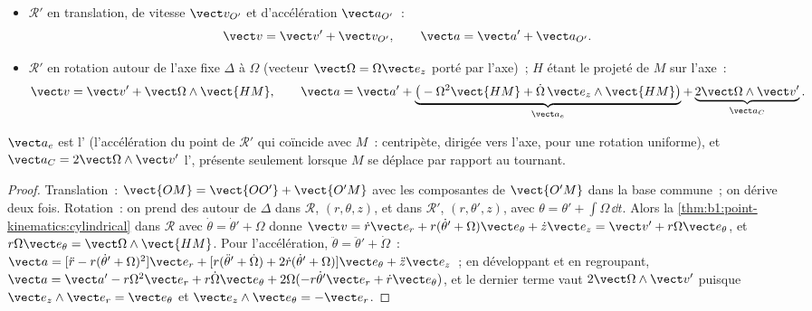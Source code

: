 \begin{theorem}\label{thm:b1:non-inertial-frames:composition}
\begin{itemize}
  \item $\mathcal R'$ en translation, de vitesse $\vect v_{O'}$ et
        d'accélération $\vect a_{O'}$~:
        \[
        \vect v = \vect v' + \vect v_{O'}, \qquad \vect a = \vect a' + \vect a_{O'} .
        \]
  \item $\mathcal R'$ en rotation autour de l'axe fixe $\Delta$ à
        $\Omega$ (vecteur $\vect\Omega = \Omega\vect e_z$ porté par
        l'axe)~; $H$ étant le projeté de $M$ sur l'axe~:
        \[
        \vect v = \vect v' + \vect\Omega\wedge\vect{HM}, \qquad
        \vect a = \vect a' + \underbrace{\big(-\Omega^2\vect{HM} + \dot\Omega\,\vect e_z\wedge\vect{HM}\big)}_{\vect a_e}
        + \underbrace{2\vect\Omega\wedge\vect v'}_{\vect a_C} .
        \]
\end{itemize}
$\vect a_e$ est l'\emph{} (l'accélération du
point de $\mathcal R'$ qui coïncide avec $M$~: centripète, dirigée vers
l'axe, pour une rotation uniforme), et $\vect a_C = 2\vect\Omega\wedge\vect v'$
l'\emph{}, présente seulement lorsque $M$ se
déplace par rapport au  tournant.
\end{theorem}

\begin{proof}
Translation~: $\vect{OM} = \vect{OO'} + \vect{O'M}$ avec les composantes
de $\vect{O'M}$ dans la base commune~; on dérive deux fois. Rotation~: on
prend des  autour de $\Delta$ dans $\mathcal R$,
$(r, \theta, z)$, et dans $\mathcal R'$, $(r, \theta', z)$, avec
$\theta = \theta' + \int\Omega\,\dd t$. Alors la
\cref{thm:b1:point-kinematics:cylindrical} dans $\mathcal R$ avec
$\dot\theta = \dot\theta' + \Omega$ donne
$\vect v = \dot r\vect e_r + r(\dot\theta' + \Omega)\vect e_\theta + \dot z\vect e_z
= \vect v' + r\Omega\vect e_\theta$, et $r\Omega\vect e_\theta = \vect\Omega\wedge\vect{HM}$.
Pour l'accélération, $\ddot\theta = \ddot\theta' + \dot\Omega$~:
$\vect a = [\ddot r - r(\dot\theta' + \Omega)^2]\vect e_r + [r(\ddot\theta' + \dot\Omega)
+ 2\dot r(\dot\theta' + \Omega)]\vect e_\theta + \ddot z\vect e_z$~; en développant et
en regroupant, $\vect a = \vect a' - r\Omega^2\vect e_r + r\dot\Omega\vect e_\theta
+ 2\Omega(-r\dot\theta'\vect e_r + \dot r\vect e_\theta)$, et le dernier terme vaut
$2\vect\Omega\wedge\vect v'$ puisque $\vect e_z\wedge\vect e_r = \vect e_\theta$ et
$\vect e_z\wedge\vect e_\theta = -\vect e_r$.
\end{proof}


